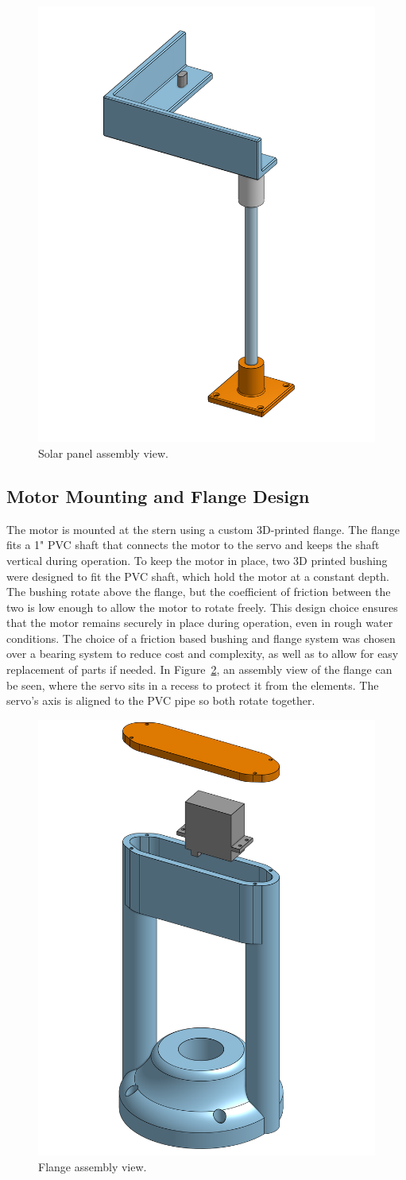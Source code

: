 \begin{figure}[htbp]
  \centering
  \includegraphics[width=0.3\linewidth]{"Solar_Panel_Assembly.png"}
  \caption{Solar panel assembly view.}
  \label{fig:solar-panel}
\end{figure}

\subsection{Motor Mounting and Flange Design}
The motor is mounted at the stern using a custom 3D-printed flange. The flange fits a 1" PVC shaft that connects the motor to the servo and keeps the shaft vertical during operation. To keep the motor in place, two 3D printed bushing were designed to fit the PVC shaft, which hold the motor at a constant depth. The bushing rotate above the flange, but the coefficient of friction between the two is low enough to allow the motor to rotate freely. This design choice ensures that the motor remains securely in place during operation, even in rough water conditions. The choice of a friction based bushing and flange system was chosen over a bearing system to reduce cost and complexity, as well as to allow for easy replacement of parts if needed. In Figure~\ref{fig:flange}, an assembly view of the flange can be seen, where the servo sits in a recess to protect it from the elements. The servo's axis is aligned to the PVC pipe so both rotate together.

\begin{figure}[htbp]
    \centering
    \includegraphics[width=0.3\linewidth]{"Flange_Assembly.png"}
    \caption{Flange assembly view.}
    \label{fig:flange}
  \end{figure}

